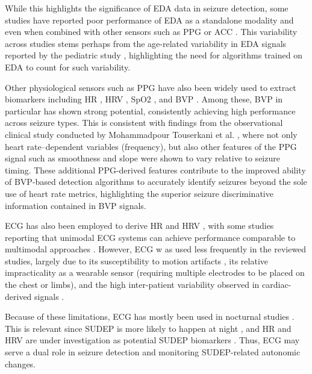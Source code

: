 While this highlights the significance of EDA data in seizure detection, some studies have reported poor performance of EDA as a standalone modality and even when combined with other sensors such as PPG or ACC \cite{Yu2023-ss,Tang2021-td}. This variability across studies stems perhaps from the age-related variability in EDA signals reported by the pediatric study \cite{Ge2023-ab}, highlighting the need for algorithms trained on EDA to count for such variability. 

Other physiological sensors such as PPG have also been widely used to extract biomarkers including HR \cite{Cogan2017-lg,Nasseri2021-xn,Vakilna2024-hk,Xu2022-tx,Jiang2022-zu,Arends2018-ew}, HRV \cite{Vakilna2024-hk,Jiang2022-zu}, SpO2 \cite{Cogan2017-lg}, and BVP \cite{Yu2023-ss,Nasseri2021-xn,Tang2021-td}. Among these, BVP in particular has shown strong potential, consistently achieving high performance across seizure types. This is consistent with findings from the observational clinical study conducted by Mohammadpour Touserkani et al. \cite{Mohammadpour_Touserkani2020-tk}, where not only heart rate–dependent variables (frequency), but also other features of the PPG signal such as smoothness and slope were shown to vary relative to seizure timing. These additional PPG-derived features contribute to the improved ability of BVP-based detection algorithms to accurately identify seizures beyond the sole use of heart rate metrics, highlighting the superior seizure discriminative information contained in BVP signals.

ECG has also been employed to derive HR \cite{Hegarty-Craver2021-hk,De_Cooman2018-pq,Van_Andel2017-yx} and HRV \cite{Hegarty-Craver2021-hk}, with some studies reporting that unimodal ECG systems can achieve performance comparable to multimodal approaches \cite{Hegarty-Craver2021-hk,De_Cooman2018-pq}. However, ECG w as used less frequently in the reviewed studies, largely due to its susceptibility to motion artifacts \cite{Van_Andel2017-yx}, its relative impracticality as a wearable sensor (requiring multiple electrodes to be placed on the chest or limbs), and the high inter-patient variability observed in cardiac-derived signals \cite{Van_Andel2017-yx,De_Cooman2018-pq}.

Because of these limitations, ECG has mostly been used in nocturnal studies \cite{De_Cooman2018-pq,Van_Andel2017-yx}. This is relevant since SUDEP is more likely to happen at night \cite{Friedman2022-mo}, and HR and HRV are under investigation as potential SUDEP   biomarkers \cite{Barot2019-nx}. Thus, ECG may serve a dual role in seizure detection and monitoring SUDEP-related autonomic changes.

